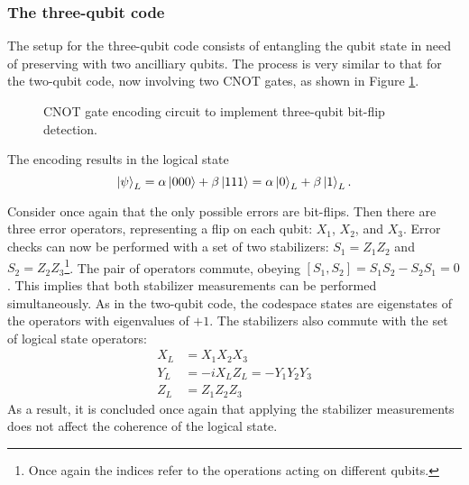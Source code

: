 \subsubsection{The three-qubit code}

The setup for the three-qubit code consists of entangling the qubit state in need of preserving with two ancilliary qubits. The process is very similar to that for the two-qubit code, now involving two CNOT gates, as shown in Figure \ref{fig:three_qub_enc}.
\begin{figure}
    \centering
    \caption{CNOT gate encoding circuit to implement three-qubit bit-flip detection.}
    \label{fig:three_qub_enc}
\end{figure}
The encoding results in the logical state
\begin{equation}
    \ket{\psi}_L = \alpha \ket{000} +\beta \ket{111}=\alpha \ket{0}_L +\beta \ket{1}_L.
\end{equation}

Consider once again that the only possible errors are bit-flips. Then there are three error operators, representing a flip on each qubit: $X_1$, $X_2$, and $X_3$. Error checks can now be performed with a set of two stabilizers: $S_1=Z_1Z_2$ and $S_2=Z_2Z_3$\footnote{Once again the indices refer to the operations acting on different qubits.}. The pair of operators commute, obeying $\left[S_1,S_2\right]=S_1S_2-S_2S_1=0$. This implies that both stabilizer measurements can be performed simultaneously. As in the two-qubit code, the codespace states are eigenstates of the operators with eigenvalues of $+1$. The stabilizers also commute with the set of logical state operators:
\begin{eqnarray}
    X_L&=X_1X_2X_3 \\
    Y_L&=-iX_LZ_L=-Y_1Y_2Y_3\\
    Z_L&=Z_1Z_2Z_3
\end{eqnarray}
As a result, it is concluded once again that applying the stabilizer measurements does not affect the coherence of the logical state.

